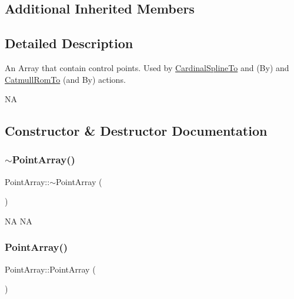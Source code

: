 \subsection*{Additional Inherited Members}


\subsection{Detailed Description}
An Array that contain control points. Used by \hyperlink{classCardinalSplineTo}{Cardinal\+Spline\+To} and (By) and \hyperlink{classCatmullRomTo}{Catmull\+Rom\+To} (and By) actions.

NA 

\subsection{Constructor \& Destructor Documentation}
\mbox{\label{classPointArray_ab5705c1774f3d3945edcf6f3d0a6ee0c}} 
\subsubsection{\texorpdfstring{$\sim$\+Point\+Array()}{~PointArray()}\hspace{0.1cm}{\footnotesize\ttfamily [1/2]}}
{\footnotesize\ttfamily Point\+Array\+::$\sim$\+Point\+Array (\begin{DoxyParamCaption}{ }\end{DoxyParamCaption})\hspace{0.3cm}{\ttfamily [virtual]}}

NA  NA \mbox{\label{classPointArray_a508483dca6a6a6333ce3cc379eaa6307}} 
\subsubsection{\texorpdfstring{Point\+Array()}{PointArray()}\hspace{0.1cm}{\footnotesize\ttfamily [1/2]}}
{\footnotesize\ttfamily Point\+Array\+::\+Point\+Array (\begin{DoxyParamCaption}{ }\end{DoxyParamCaption})}

